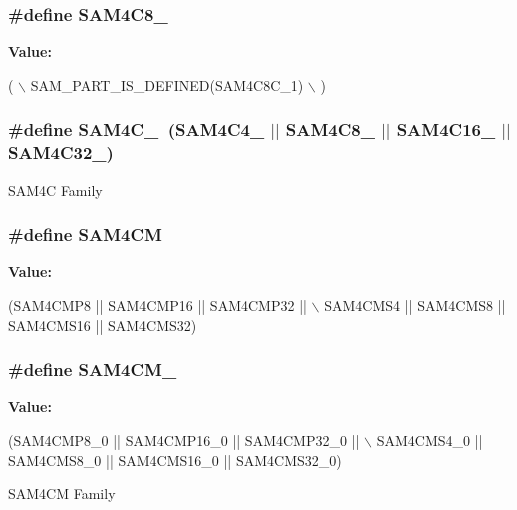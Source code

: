 \subsubsection[{S\+A\+M4\+C8\+\_\+1}]{\setlength{\rightskip}{0pt plus 5cm}\#define S\+A\+M4\+C8\+\_}\label{group__sam__part__macros__group_ga349700d2ac7573d426776e85f7632361}
{\bfseries Value\+:}
\begin{DoxyCode}
( \(\backslash\)
        SAM\_PART\_IS\_DEFINED(SAM4C8C\_1) \(\backslash\)
        )
\end{DoxyCode}
\hypertarget{group__sam__part__macros__group_ga5033d451b0d964e7a95f7b70a33dec8b}{}
\subsubsection[{S\+A\+M4\+C\+\_\+0}]{\setlength{\rightskip}{0pt plus 5cm}\#define S\+A\+M4\+C\+\_~(S\+A\+M4\+C4\+\_ $\vert$$\vert$ S\+A\+M4\+C8\+\_ $\vert$$\vert$ S\+A\+M4\+C16\+\_ $\vert$$\vert$ S\+A\+M4\+C32\+\_)}\label{group__sam__part__macros__group_ga5033d451b0d964e7a95f7b70a33dec8b}
S\+A\+M4\+C Family \hypertarget{group__sam__part__macros__group_ga067569f8932adc3c2b869ead8c68f7de}{}
\subsubsection[{S\+A\+M4\+C\+M}]{\setlength{\rightskip}{0pt plus 5cm}\#define S\+A\+M4\+C\+M}\label{group__sam__part__macros__group_ga067569f8932adc3c2b869ead8c68f7de}
{\bfseries Value\+:}
\begin{DoxyCode}
(SAM4CMP8 || SAM4CMP16 || SAM4CMP32 || \(\backslash\)
            SAM4CMS4 || SAM4CMS8 || SAM4CMS16 || SAM4CMS32)
\end{DoxyCode}
\hypertarget{group__sam__part__macros__group_gadbca33c488233ea066312c7c93b62965}{}
\subsubsection[{S\+A\+M4\+C\+M\+\_\+0}]{\setlength{\rightskip}{0pt plus 5cm}\#define S\+A\+M4\+C\+M\+\_}\label{group__sam__part__macros__group_gadbca33c488233ea066312c7c93b62965}
{\bfseries Value\+:}
\begin{DoxyCode}
(SAM4CMP8\_0 || SAM4CMP16\_0 || SAM4CMP32\_0 || \(\backslash\)
            SAM4CMS4\_0 || SAM4CMS8\_0 || SAM4CMS16\_0 || SAM4CMS32\_0)
\end{DoxyCode}
S\+A\+M4\+C\+M Family \hypertarget{group__sam__part__macros__group_ga40dfb0460f36223679de0af78510caab}{}
